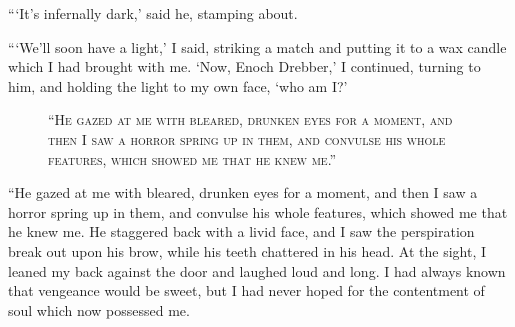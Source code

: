 \documentclass[12pt,english,oneside]{book}
\newcommand{\noun}[1]{\textsc{#1}}
\begin{document}
{}```It's infernally dark,' said he, stamping about.

{}```We'll soon have a light,' I said, striking a match and putting
it to a wax candle which I had brought with me. `Now, Enoch Drebber,'
I continued, turning to him, and holding the light to my own face,
`who am I?'

%
\begin{figure}[htbp]
\noindent {}

\noindent \begin{center}\noun{{}``He gazed at me with bleared,
drunken eyes for a moment, and then I saw a horror spring up in them,
and convulse his whole features, which showed me that he knew me.''}\end{center}
\end{figure}
{}``He gazed at me with bleared, drunken eyes for a moment, and then
I saw a horror spring up in them, and convulse his whole features,
which showed me that he knew me. He staggered back with a livid face,
and I saw the perspiration break out upon his brow, while his teeth
chattered in his head. At the sight, I leaned my back against the
door and laughed loud and long. I had always known that vengeance
would be sweet, but I had never hoped for the contentment of soul
which now possessed me.
\end{document}
